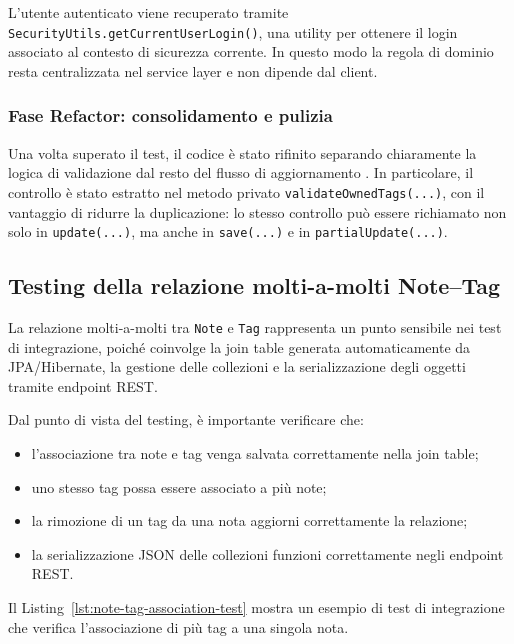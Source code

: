 L'utente autenticato viene recuperato tramite \texttt{SecurityUtils.getCurrentUserLogin()}, una utility per ottenere il login associato al contesto di sicurezza corrente. In questo modo la regola di dominio resta centralizzata nel service layer e non dipende dal client.

\subsubsection{Fase Refactor: consolidamento e pulizia}
\label{subsec:refactor}

Una volta superato il test, il codice è stato rifinito separando chiaramente la logica di validazione dal resto del flusso di aggiornamento \cite{Fowler2018}. In particolare, il controllo è stato estratto nel metodo privato \texttt{validateOwnedTags(...)}, con il vantaggio di ridurre la duplicazione: lo stesso controllo può essere richiamato non solo in \texttt{update(...)}, ma anche in \texttt{save(...)} e in \texttt{partialUpdate(...)}.

\subsection{Testing della relazione molti-a-molti Note--Tag}
\label{sec:test-moltimolti}

La relazione molti-a-molti tra \texttt{Note} e \texttt{Tag} rappresenta un punto sensibile nei test di integrazione, poiché coinvolge la join table generata automaticamente da JPA/Hibernate, la gestione delle collezioni e la serializzazione degli oggetti tramite endpoint REST.

Dal punto di vista del testing, è importante verificare che:

\begin{itemize}
	\item l'associazione tra note e tag venga salvata correttamente nella join table;
	\item uno stesso tag possa essere associato a più note;
	\item la rimozione di un tag da una nota aggiorni correttamente la relazione;
	\item la serializzazione JSON delle collezioni funzioni correttamente negli endpoint REST.
\end{itemize}

Il Listing~\ref{lst:note-tag-association-test} mostra un esempio di test di integrazione che verifica l'associazione di più tag a una singola nota.

